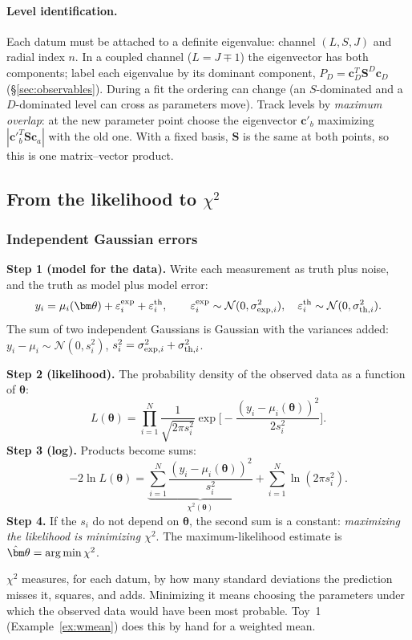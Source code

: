 \documentclass[11pt,a4paper]{article}
\numberwithin{equation}{section}
\theoremstyle{definition}
\theoremstyle{plain}
\theoremstyle{remark}
\newenvironment{plainwords}[1][In plain words]{\begin{tcolorbox}[plainbox,title={\small\bfseries #1},fonttitle=\small,coltitle=white,colbacktitle=ForestGreen!60!black]}{\end{tcolorbox}}
\numberwithin{algorithm}{section}
\newcommand{\mS}{\mathbf S}
\newcommand{\vc}{\bm c}
\newcommand{\vth}{\bm\theta}
\begin{document}
\paragraph{Level identification.} Each datum must be attached to a definite eigenvalue: channel $(L,S,J)$ and radial index $n$. In a coupled channel ($L=J\mp1$) the eigenvector has both components; label each eigenvalue by its dominant component, $P_D=\vc_D^T\mS^D\vc_D$ (\S\ref{sec:observables}). During a fit the ordering can change (an $S$-dominated and a $D$-dominated level can cross as parameters move). Track levels by \emph{maximum overlap}: at the new parameter point choose the eigenvector $\vc'_b$ maximizing $|\vc'^T_b\mS\vc_a|$ with the old one. With a fixed basis, $\mS$ is the same at both points, so this is one matrix--vector product.

\subsection{\texorpdfstring{From the likelihood to $\chi^2$}{From the likelihood to chi-squared}}\label{sec:chi2}
\subsubsection{Independent Gaussian errors}
\textbf{Step 1 (model for the data).} Write each measurement as truth plus noise, and the truth as model plus model error:
\begin{equation}
y_i=\mu_i(\vth)+\varepsilon_i^{\rm exp}+\varepsilon_i^{\rm th},\qquad \varepsilon_i^{\rm exp}\sim\mathcal N(0,\sigma_{{\rm exp},i}^2),\quad \varepsilon_i^{\rm th}\sim\mathcal N(0,\sigma_{{\rm th},i}^2).
\end{equation}
The sum of two independent Gaussians is Gaussian with the variances added: $y_i-\mu_i\sim\mathcal N(0,s_i^2)$, $s_i^2=\sigma_{{\rm exp},i}^2+\sigma_{{\rm th},i}^2$.

\textbf{Step 2 (likelihood).} The probability density of the observed data as a function of $\vth$:
\begin{equation}
L(\vth)=\prod_{i=1}^N\frac{1}{\sqrt{2\pi s_i^2}}\exp\Big[-\frac{(y_i-\mu_i(\vth))^2}{2s_i^2}\Big].
\end{equation}
\textbf{Step 3 (log).} Products become sums:
\begin{equation}
-2\ln L(\vth)=\underbrace{\sum_{i=1}^N\frac{(y_i-\mu_i(\vth))^2}{s_i^2}}_{\chi^2(\vth)}+\sum_{i=1}^N\ln(2\pi s_i^2).
\label{eq:m2lnL}
\end{equation}
\textbf{Step 4.} If the $s_i$ do not depend on $\vth$, the second sum is a constant: \emph{maximizing the likelihood is minimizing $\chi^2$}. The maximum-likelihood estimate is $\hat\vth=\arg\min\chi^2$.
\begin{plainwords}[In plain words]
$\chi^2$ measures, for each datum, by how many standard deviations the prediction misses it, squares, and adds. Minimizing it means choosing the parameters under which the observed data would have been most probable. Toy~1 (Example~\ref{ex:wmean}) does this by hand for a weighted mean.
\end{plainwords}
\end{document}
